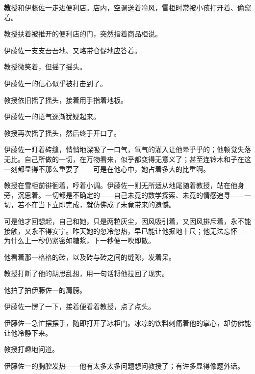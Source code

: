 
\AddSymbolsF
\pagecolor{ForestGreen!15!Gray!}
\color{white}
\quad\quad \lettrine[,lraise=0.2,lhang=0.5]
{\textbf{教}}{授}和伊藤佐一走进便利店。店内，空调送着冷风，雪柜时常被小孩打开着、偷窥着。


教授扶着被推开的便利店的门，突然指着商品柜说。

伊藤佐一支支吾吾地、又略带仓促地应答着。

教授微笑着，但摇了摇头。

伊藤佐一的信心似乎被打击到了。

教授依旧摇了摇头，接着用手指着地板。

伊藤佐一的语气逐渐犹疑起来。

教授再次摇了摇头，然后终于开口了。

伊藤佐一盯着砖缝，悄悄地深吸了一口气，氧气的灌入让他晕乎乎的；他顿觉失落无比。自己所做的一切，在万物看来，似乎都变得无意义了；甚至连铃木和子在这一刻都显得不那么重要了——可是在他心中，她占着多大的比重啊。

教授在雪柜前徘徊着，哼着小调。伊藤佐一则无所适从地尾随着教授，站在他身旁，沉思着。一切都是不确定的——自己未竟的数学探索、未竟的情感追寻——一切，若不在当下立即完成，就仿佛成了未竟带来的遗憾。

可是他才回想起，自己和她，只是两粒灰尘，因风吸引着，又因风排斥着，永不能接触，又永不得安宁。昨天她的忽冷忽热，早已能让他掘地十尺；他无法忘怀——为什么上一秒仍紧密如糖浆，下一秒便一吹即散。

他看着那一格格的砖，以及砖与砖之间的缝隙，发着呆。

教授打断了他的胡思乱想，用一句话将他拉回了现实。


他拍了拍伊藤佐一的肩膀。

伊藤佐一愣了一下，接着便看着教授，点了点头。


伊藤佐一急忙摆摆手，随即打开了冰柜门。冰凉的饮料刺痛着他的掌心，却仿佛能让他冷静下来。

教授打趣地问道。

伊藤佐一的胸腔发热——他有太多太多问题想问教授了；有许多显得像题外话。

